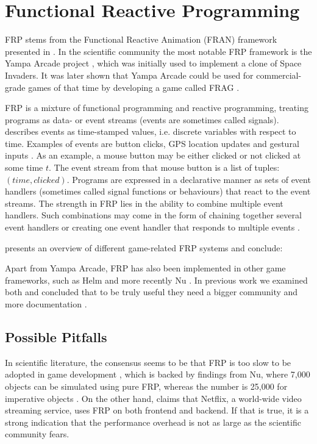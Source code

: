 \section{Functional Reactive Programming}
\gls{FRP} stems from the Functional Reactive Animation (FRAN) framework presented in \cite{ElliottHudak97:Fran}. In the scientific community the most notable \gls{FRP} framework is the Yampa Arcade project \cite{courtney2003yampa}, which was initially used to implement a clone of Space Invaders. It was later shown that Yampa Arcade could be used for commercial-grade games of that time by developing a game called FRAG \cite{cheong2005functional}.

\gls{FRP} is a mixture of functional programming and reactive programming, treating programs as data- or event streams (events are sometimes called signals). \cite{lettier:frp} describes events as time-stamped values, i.e. discrete variables with respect to time. Examples of events are button clicks, GPS location updates and gestural inputs \cite{singh:frp}. As an example, a mouse button may be either clicked or not clicked at some time $t$. The event stream from that mouse button is a list of tuples: $(time,clicked)$. Programs are expressed in a declarative manner as sets of event handlers (sometimes called signal functions or behaviours) that react to the event streams. The strength in \gls{FRP} lies in the ability to combine multiple event handlers. Such combinations may come in the form of chaining together several event handlers or creating one event handler that responds to multiple events \cite{lettier:frp}.

\cite{maraffi:frp} presents an overview of different game-related \gls{FRP} systems and conclude:

Apart from Yampa Arcade, \gls{FRP} has also been implemented in other game frameworks, such as Helm \cite{helm:wiki} and more recently Nu \cite{nu:github}. In previous work we examined both and concluded that to be truly useful they need a bigger community and more documentation \cite{p92018gameplay}.

\subsection{Possible Pitfalls}
In scientific literature, the consensus seems to be that \gls{FRP} is too slow to be adopted in game development \cite{maraffi:frp,cheong2005functional}, which is backed by findings from Nu, where 7,000 objects can be simulated using pure \gls{FRP}, whereas the number is 25,000 for imperative objects \cite{edds2016whyFunctional}. On the other hand, \cite{rey:frp} claims that Netflix, a world-wide video streaming service, uses \gls{FRP} on both frontend and backend. If that is true, it is a strong indication that the performance overhead is not as large as the scientific community fears.

